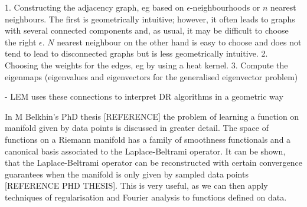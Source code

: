 1. Constructing the adjacency graph, eg based on \( \epsilon \)-neighbourhoods or \( n \) nearest neighbours.
The first is geometrically intuitive; however, it often leads to graphs with several connected components and, as usual, it may be difficult to choose the right \( \epsilon \). \( N \) nearest neighbour on the other hand is easy to choose and does not tend to lead to disconnected graphs but is less geometrically intuitive.
2. Choosing the weights for the edges, eg by using a heat kernel.
3. Compute the eigenmaps (eigenvalues and eigenvectors for the generalised eigenvector problem)

- LEM uses these connections to interpret DR algorithms in a geometric way %



In M Belkhin's PhD thesis [REFERENCE] the problem of learning a function on manifold given by data points is discussed in greater detail. The space of functions on a Riemann manifold has a family of smoothness functionals and a canonical basis associated to the Laplace-Beltrami operator. It can be shown, that the Laplace-Beltrami operator can be reconstructed with certain convergence guarantees when the manifold is only given by sampled data points [REFERENCE PHD THESIS]. This is very useful, as we can then apply techniques of regularisation and Fourier analysis to functions defined on data. 
 
 
